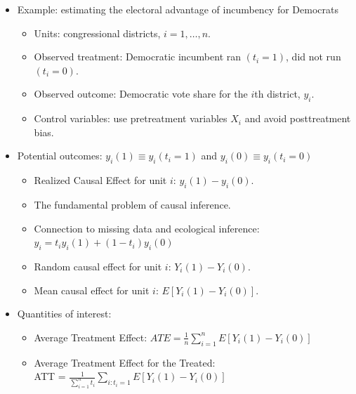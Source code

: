 \documentclass[20pt,landscape,pdftex]{foils}
\begin{document}


\hypersetup{pdfpagetransition=Replace}

\begin{itemize}

\item Example: estimating the electoral advantage of incumbency for
  Democrats\pause
  \begin{itemize}
  \item Units: congressional districts, $i=1,\dots,n$.\pause
  \item Observed treatment: Democratic incumbent ran $(t_i=1)$, did
    not run $(t_i=0)$.\pause
  \item Observed outcome: Democratic vote share for the $i$th
    district, $y_i$.\pause
  \item Control variables: use pretreatment variables $X_i$ and avoid
    posttreatment bias.
  \end{itemize}

\item Potential outcomes: $y_i(1) \equiv y_i(t_i=1)$ and $y_i(0)
  \equiv y_i(t_i=0)$\pause  
  \begin{itemize}
  \item Realized Causal Effect for unit $i$: $y_i(1) - y_i(0)$.\pause
  \item The fundamental problem of causal inference.\pause
  \item Connection to missing data and ecological inference:\\ $y_i =
    t_i y_i(1) + (1-t_i) y_i(0)$\pause
  \item Random causal effect for unit $i$: $Y_i(1) - Y_i(0).$\pause
  \item Mean causal effect for unit $i$: $E[Y_i(1) - Y_i(0)].$\pause
  \end{itemize}

\item Quantities of interest:\pause
  \begin{itemize}
    \item Average Treatment Effect: $ATE = \frac{1}{n}\sum_{i=1}^n E[Y_i(1) - Y_i(0)]$
      \bigskip
    \item Average Treatment Effect for the Treated:\\ ATT = $\frac{1}{\sum_{i=1}^n t_i}\sum_{i:t_i=1} E[Y_i(1) - Y_i(0)]$
  \end{itemize}
\end{itemize}
\end{document}
